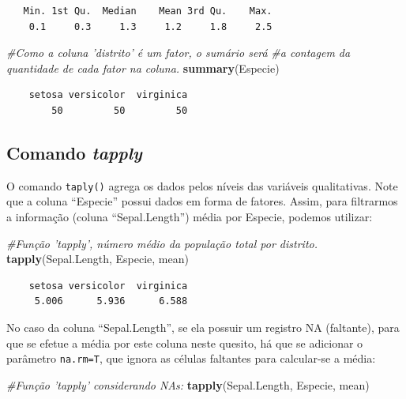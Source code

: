\documentclass[12pt,brazil,]{book}
\newenvironment{Shaded}{\begin{snugshade}}{\end{snugshade}}
\newcommand{\CommentTok}[1]{\textcolor[rgb]{0.56,0.35,0.01}{\textit{#1}}}
\newcommand{\KeywordTok}[1]{\textcolor[rgb]{0.13,0.29,0.53}{\textbf{#1}}}
\newcommand{\NormalTok}[1]{#1}
\begin{document}
\begin{verbatim}
   Min. 1st Qu.  Median    Mean 3rd Qu.    Max. 
    0.1     0.3     1.3     1.2     1.8     2.5 
\end{verbatim}

\begin{Shaded}
\begin{Highlighting}[]
\CommentTok{#Como a coluna 'distrito' é um fator, o sumário será }
\CommentTok{#a contagem da quantidade de cada fator na coluna.}
\KeywordTok{summary}\NormalTok{(Especie)}
\end{Highlighting}
\end{Shaded}

\begin{verbatim}
    setosa versicolor  virginica 
        50         50         50 
\end{verbatim}

\hypertarget{comando-tapply}{%
\subsection{\texorpdfstring{Comando
\emph{tapply}}{Comando tapply}}\label{comando-tapply}}

O comando \texttt{taply()} agrega os dados pelos níveis das variáveis
qualitativas. Note que a coluna ``Especie'' possui dados em forma de
fatores. Assim, para filtrarmos a informação (coluna ``Sepal.Length'')
média por Especie, podemos utilizar:

\begin{Shaded}
\begin{Highlighting}[]
\CommentTok{#Função 'tapply', número médio da população total por distrito.}
\KeywordTok{tapply}\NormalTok{(Sepal.Length, Especie, mean)}
\end{Highlighting}
\end{Shaded}

\begin{verbatim}
    setosa versicolor  virginica 
     5.006      5.936      6.588 
\end{verbatim}

No caso da coluna ``Sepal.Length'', se ela possuir um registro NA
(faltante), para que se efetue a média por este coluna neste quesito, há
que se adicionar o parâmetro \texttt{na.rm=T}, que ignora as células
faltantes para calcular-se a média:

\begin{Shaded}
\begin{Highlighting}[]
\CommentTok{#Função 'tapply' considerando NAs:}
\KeywordTok{tapply}\NormalTok{(Sepal.Length, Especie, mean)}
\end{Highlighting}
\end{Shaded}
\end{document}
